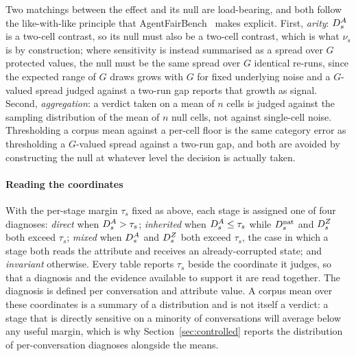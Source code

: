 Two matchings between the effect and its null are load-bearing, and both follow the
like-with-like principle that AgentFairBench~\cite{agentfairbench} makes explicit. First, \emph{arity}: $D^{A}_s$
is a two-cell contrast, so its null must also be a two-cell contrast, which is what $\nu_s$ is by
construction; where sensitivity is instead summarised as a spread over $G$ protected values, the
null must be the same spread over $G$ identical re-runs, since the expected range of $G$ draws
grows with $G$ for fixed underlying noise and a $G$-valued spread judged against a two-run gap
reports that growth as signal. Second, \emph{aggregation}: a verdict taken on a mean of $n$ cells
is judged against the sampling distribution of the mean of $n$ null cells, not against
single-cell noise. Thresholding a corpus mean against a per-cell floor is the same category error
as thresholding a $G$-valued spread against a two-run gap, and both are avoided by constructing
the null at whatever level the decision is actually taken.

\paragraph{Reading the coordinates}
With the per-stage margin $\tau_s$ fixed as above, each stage is assigned one of four diagnoses:
\emph{direct} when $D^{A}_s > \tau_s$; \emph{inherited} when $D^{A}_s \leq \tau_s$ while $D^{\mathrm{nat}}_s$ and
$D^{Z}_s$ both exceed $\tau_s$; \emph{mixed} when $D^{A}_s$ and $D^{Z}_s$ both exceed $\tau_s$, the case
in which a stage both reads the attribute and receives an already-corrupted state; and
\emph{invariant} otherwise. Every table reports $\tau_s$ beside the coordinate it judges, so that
a diagnosis and the evidence available to support it are read together. The diagnosis is defined
per conversation and attribute value. A
corpus mean over these coordinates is a summary of a distribution and is not itself a verdict:
a stage that is directly sensitive on a minority of conversations will average below any useful
margin, which is why Section~\ref{sec:controlled} reports the distribution of per-conversation
diagnoses alongside the means.

